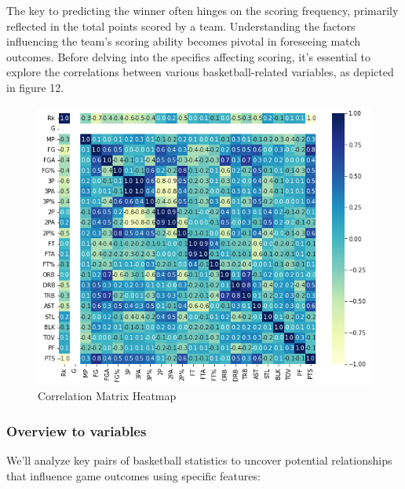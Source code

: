 \documentclass[conference]{IEEEtran}
\begin{document}
The key to predicting the winner often hinges on the scoring frequency, primarily reflected in the total points scored by a team. Understanding the factors influencing the team's scoring ability becomes pivotal in foreseeing match outcomes. Before delving into the specifics affecting scoring, it's essential to explore the correlations between various basketball-related variables, as depicted in figure 12.
\begin{figure}[h]
    \centering
    \includegraphics[scale=0.41]{heatmap.png}
    \caption{Correlation Matrix Heatmap}
    \label{fig:enter-label}
\end{figure}
\subsubsection{Overview to variables}

We'll analyze key pairs of basketball statistics to uncover potential relationships that influence game outcomes using specific features:
\vspace{\baselineskip}
\end{document}

